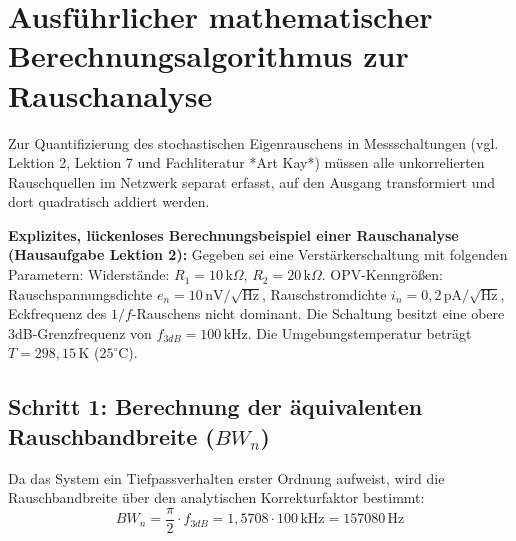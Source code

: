 \documentclass[11pt,a4paper]{article}
\begin{document}
\newpage

\section{Ausführlicher mathematischer Berechnungsalgorithmus zur Rauschanalyse}

Zur Quantifizierung des stochastischen Eigenrauschens in Messschaltungen (vgl. Lektion 2, Lektion 7 und Fachliteratur *Art Kay*) müssen alle unkorrelierten Rauschquellen im Netzwerk separat erfasst, auf den Ausgang transformiert und dort quadratisch addiert werden.

\textbf{Explizites, lückenloses Berechnungsbeispiel einer Rauschanalyse (Hausaufgabe Lektion 2):}
Gegeben sei eine Verstärkerschaltung mit folgenden Parametern:
Widerstände: $R_1 = 10\,\text{k}\Omega$, $R_2 = 20\,\text{k}\Omega$.
OPV-Kenngrößen: Rauschspannungsdichte $e_n = 10\,\text{nV}/\sqrt{\text{Hz}}$, Rauschstromdichte $i_n = 0{,}2\,\text{pA}/\sqrt{\text{Hz}}$, Eckfrequenz des $1/f$-Rauschens nicht dominant.
Die Schaltung besitzt eine obere 3dB-Grenzfrequenz von $f_{3dB} = 100\,\text{kHz}$. Die Umgebungstemperatur beträgt $T = 298{,}15\,\text{K}$ ($25^\circ\text{C}$).

\subsection{Schritt 1: Berechnung der äquivalenten Rauschbandbreite ($BW_n$)}
Da das System ein Tiefpassverhalten erster Ordnung aufweist, wird die Rauschbandbreite über den analytischen Korrekturfaktor bestimmt:
\begin{equation}
BW_n = \frac{\pi}{2} \cdot f_{3dB} = 1{,}5708 \cdot 100\,\text{kHz} = 157080\,\text{Hz}
\end{equation}
\end{document}
